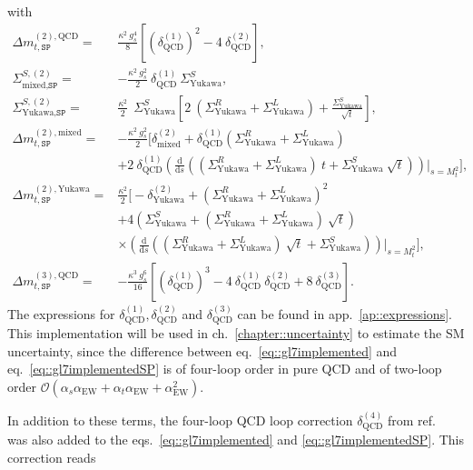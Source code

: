 \documentclass[a4paper,12pt]{book}
\begin{document}
with 
\begin{align}
\label{eq::dmt2QCDsp}
\Delta m_{t,\texttt{SP}}^{(2),\text{QCD}} ={}& \frac{\kappa^2\> g_s^4}{8}\left[\left(\delta^{(1)}_\text{QCD}\right)^2-4\> \delta^{(2)}_\text{QCD}\right],\\
\Sigma_{\text{mixed},\texttt{SP}}^{S,(2)} ={}& -\frac{\kappa^2 \>g_s^2}{2}\> \delta^{(1)}_\text{QCD} \> \Sigma_\text{Yukawa}^S,\\
\Sigma_{\text{Yukawa},\texttt{SP}}^{S,(2)} ={}& \frac{\kappa^2}{2}\> \> \Sigma_\text{Yukawa}^S \left[2\>\left(\Sigma_\text{Yukawa}^R+\Sigma_\text{Yukawa}^L\right)+\frac{\Sigma_\text{Yukawa}^S}{\sqrt{t}}\right],\\
\nonumber
\Delta m_{t,\texttt{SP}}^{(2),\text{mixed}}={}&-\frac{\kappa^2 \> g_s^2}{2}\bigg[\delta^{(2)}_\text{mixed}+\delta^{(1)}_\text{QCD}\left(\Sigma_\text{Yukawa}^R+\Sigma_\text{Yukawa}^L\right)\\
&+2\>\delta^{(1)}_\text{QCD}\left(\frac{\text{d}}{\text{d}s}\left(\left(\Sigma_\text{Yukawa}^R+\Sigma_\text{Yukawa}^L\right)\> t+ \Sigma_\text{Yukawa}^S \> \sqrt{t}\right)\right)\bigg|_{s=M_t^2}\bigg],\\
\nonumber
\Delta m_{t,\texttt{SP}}^{(2),\text{Yukawa}}={}& \frac{\kappa^2}{2}\biggl[-\delta^{(2)}_\text{Yukawa}+\left(\Sigma_\text{Yukawa}^R+\Sigma_\text{Yukawa}^L\right)^2\\
\nonumber
&+4 \left(\Sigma_\text{Yukawa}^S+\left(\Sigma_\text{Yukawa}^R+\Sigma_\text{Yukawa}^L\right)\> \sqrt{t}\right)\\
&\times\left(\frac{\text{d}}{\text{d}s}\left(\left(\Sigma_\text{Yukawa}^R+\Sigma_\text{Yukawa}^L\right)\> \sqrt{t}+ \Sigma_\text{Yukawa}^S\right)\right)\bigg|_{s=M_t^2}\biggr],\\
\label{eq::dmt3QCDsp}
\Delta m_{t,\texttt{SP}}^{(3),\text{QCD}} ={}& -\frac{\kappa^3 \> g_s^6}{16}\left[\left(\delta^{(1)}_\text{QCD}\right)^3-4\> \delta^{(1)}_\text{QCD} \> \delta^{(2)}_\text{QCD}+8\>\delta^{(3)}_\text{QCD}\right].
\end{align}
The expressions for $\delta^{(1)}_\text{QCD},\delta^{(2)}_\text{QCD}$ and $\delta^{(3)}_\text{QCD}$ can be found in app.\ \ref{ap::expressions}. This implementation will be used in ch.\ \ref{chapter::uncertainty} to estimate the SM uncertainty, since the difference between eq.\ \eqref{eq::gl7implemented} and eq.\ \eqref{eq::gl7implementedSP} is of four-loop order in pure QCD and of two-loop order $\mathcal{O}(\alpha_s\alpha_\text{EW}+\alpha_t \alpha_\text{EW}+\alpha_\text{EW}^2)$.\par
In addition to these terms, the four-loop QCD loop correction $\delta^{(4)}_\text{QCD}$ from ref.\ \cite{martinmain} was also added to the eqs.\ \eqref{eq::gl7implemented} and \eqref{eq::gl7implementedSP}. This correction reads
\end{document}
